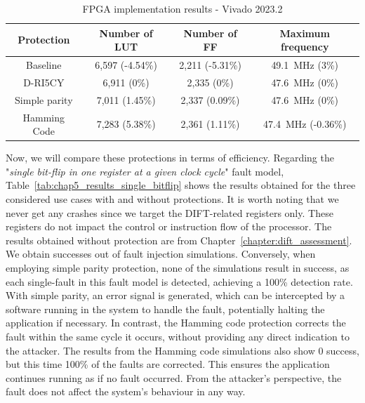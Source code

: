 \begin{table}[t]
    \footnotesize
    \centering
    \caption{FPGA implementation results - Vivado 2023.2}
    \label{tab:chap5_implementation}
    \setlength{\tabcolsep}{3pt}
    \begin{tabular}{@{}c|ccc@{}}
        \toprule
        Protection    & Number of LUT   & Number of FF    & Maximum frequency                \\ \midrule
        Baseline      & 6,597 (-4.54\%) & 2,211 (-5.31\%) & \SI{49.1}{\mega\hertz} (3\%)     \\
        D-RI5CY       & 6,911 (0\%)     & 2,335 (0\%)     & \SI{47.6}{\mega\hertz} (0\%)     \\
        Simple parity & 7,011 (1.45\%)  & 2,337 (0.09\%)  & \SI{47.6}{\mega\hertz} (0\%)     \\
        Hamming Code  & 7,283 (5.38\%)  & 2,361 (1.11\%)  & \SI{47.4}{\mega\hertz} (-0.36\%) \\
        \bottomrule
    \end{tabular}
\end{table}

Now, we will compare these protections in terms of efficiency.
Regarding the "\textit{single bit-flip in one register at a given clock cycle}" fault model, Table~\ref{tab:chap5_results_single_bitflip} shows the results obtained for the three considered use cases with and without protections. It is worth noting that we never get any crashes since we target the DIFT-related registers only. These registers do not impact the control or instruction flow of the processor.
The results obtained without protection are from Chapter~\ref{chapter:dift_assessment}. We obtain  successes out of  fault injection simulations.
Conversely, when employing simple parity protection, none of the  simulations result in success, as each single-fault in this fault model is detected, achieving a 100\% detection rate. With simple parity, an error signal is generated, which can be intercepted by a software running in the system to handle the fault, potentially halting the application if necessary. In contrast, the Hamming code protection corrects the fault within the same cycle it occurs, without providing any direct indication to the attacker. The results from the Hamming code simulations also show 0 success, but this time 100\% of the faults are corrected. This ensures the application continues running as if no fault occurred. From the attacker’s perspective, the fault does not affect the system’s behaviour in any way.

